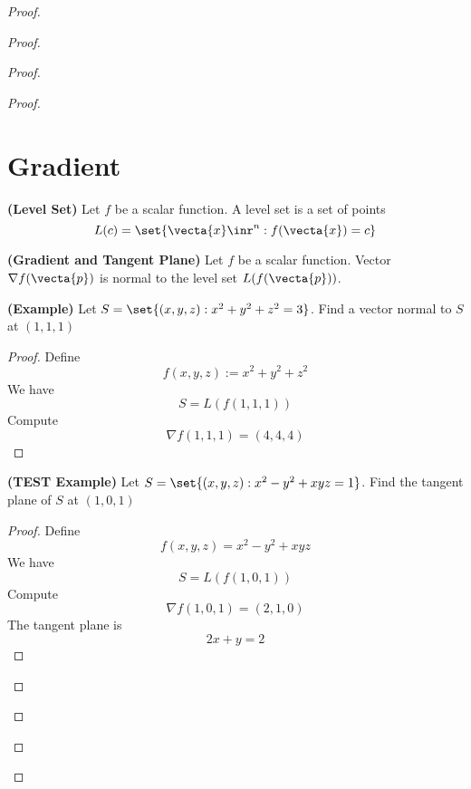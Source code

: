 \documentclass{report}
\begin{document}
\begin{proof}
\begin{proof}
\begin{proof}
\begin{proof}
\section{Gradient}
\begin{definition}
\label{8.5.1}
\textbf{(Level Set)} Let $f$ be a scalar function. A level set is a set of points
\begin{equation}
L(c)=\set{\vecta{x}\inr^n: f(\vecta{x})=c}
\end{equation}
\end{definition}
\begin{theorem}
\label{8.5.2}
\textbf{(Gradient and Tangent Plane)} Let $f$ be a scalar function. Vector $\nabla f(\vecta{p})$ is normal to the level set $L(f(\vecta{p}))$. 
\end{theorem}
\begin{theorem}
\label{8.5.3}
\textbf{(Example)} Let $S=\set{(x,y,z):x^2+y^2+z^2=3}$. Find a vector normal to $S$ at  $(1,1,1)$
\end{theorem}
\begin{proof}
Define
\begin{equation}
f(x,y,z):=x^2+y^2+z^2 
\end{equation}
We have
\begin{equation}
S=L(f(1,1,1))
\end{equation}
Compute
\begin{equation}
\nabla f(1,1,1)=(4,4,4)
\end{equation}
\end{proof}
\begin{theorem}
\label{8.5.4}
\textbf{(TEST Example)} Let $S=\set{(x,y,z):x^2-y^2+xyz=1}$. Find the tangent plane of $S$ at $(1,0,1)$ 
\end{theorem}
\begin{proof}
Define
\begin{equation}
f(x,y,z)=x^2-y^2+xyz
\end{equation}
We have
\begin{equation}
S=L(f(1,0,1))
\end{equation}
Compute
\begin{equation}
\nabla f(1,0,1)=(2,1,0)
\end{equation}
The tangent plane is 
\begin{equation}
2x+y=2
\end{equation}
\end{proof}

\end{proof}
\end{proof}
\end{proof}
\end{proof}
\end{document}
